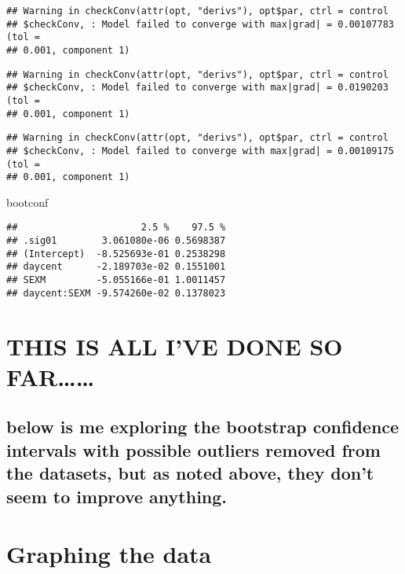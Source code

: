 \documentclass[]{article}
\newenvironment{Shaded}{\begin{snugshade}}{\end{snugshade}}
\newcommand{\NormalTok}[1]{#1}
\begin{document}
\begin{verbatim}
## Warning in checkConv(attr(opt, "derivs"), opt$par, ctrl = control
## $checkConv, : Model failed to converge with max|grad| = 0.00107783 (tol =
## 0.001, component 1)
\end{verbatim}

\begin{verbatim}
## Warning in checkConv(attr(opt, "derivs"), opt$par, ctrl = control
## $checkConv, : Model failed to converge with max|grad| = 0.0190203 (tol =
## 0.001, component 1)
\end{verbatim}

\begin{verbatim}
## Warning in checkConv(attr(opt, "derivs"), opt$par, ctrl = control
## $checkConv, : Model failed to converge with max|grad| = 0.00109175 (tol =
## 0.001, component 1)
\end{verbatim}

\begin{Shaded}
\begin{Highlighting}[]
\NormalTok{bootconf}
\end{Highlighting}
\end{Shaded}

\begin{verbatim}
##                      2.5 %    97.5 %
## .sig01        3.061080e-06 0.5698387
## (Intercept)  -8.525693e-01 0.2538298
## daycent      -2.189703e-02 0.1551001
## SEXM         -5.055166e-01 1.0011457
## daycent:SEXM -9.574260e-02 0.1378023
\end{verbatim}

\section{THIS IS ALL I'VE DONE SO
FAR\ldots{}\ldots{}}\label{this-is-all-ive-done-so-far}

\subsection{below is me exploring the bootstrap confidence intervals
with possible outliers removed from the datasets, but as noted above,
they don't seem to improve
anything.}\label{below-is-me-exploring-the-bootstrap-confidence-intervals-with-possible-outliers-removed-from-the-datasets-but-as-noted-above-they-dont-seem-to-improve-anything.}

\section{Graphing the data}\label{graphing-the-data}
\end{document}
